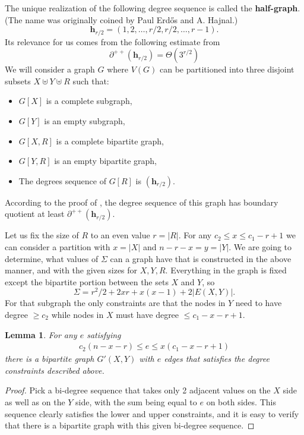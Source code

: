 \documentclass[11pt]{elsarticle}
\theoremstyle{plain}
\newtheorem{lemma}[theorem]{Lemma}
\theoremstyle{definition}
\newcommand{\pppp}[1]{\partial^{++}(#1)}
\begin{document}
The unique realization of the following degree sequence is called the \textbf{half-graph}. (The name was originally coined by Paul Erd\H{o}s and A. Hajnal.)
$$
\mathbf{h}_{r/2}=(1,2,\dots,r/2,r/2,\dots, r-1).
$$
Its relevance for us comes from the following estimate from~\cite{JMS92}
\begin{equation}\label{eq:fully-iff3}
\pppp {\mathbf{h}_{r/2}}= \Theta\left(3^{r/2}\right)%
\end{equation}
We will consider a graph $G$ where $V(G)$ can be partitioned into three disjoint subsets $X \uplus Y \uplus R$ such that:
\begin{itemize}
    \item $G[X]$ is a complete subgraph,
    \item $G[Y]$ is an empty subgraph,
    \item $G[X,R]$ is a complete bipartite graph,
    \item $G[Y,R]$ is an empty bipartite graph,
    \item The degrees sequence of $G[R]$ is $(\mathbf{h}_{r/2}).$
\end{itemize}
According to the proof of  \cite[Theorem 8.2]{JMS92},  the degree sequence of this graph has boundary quotient at least $\pppp {\mathbf{h}_{r/2}}$.

Let us fix the size of $R$ to an even value \(r=|R|\). For any \(c_2 \leq x \leq c_1-r+1\) we can consider a partition with \(x=|X|\) and \(n-r-x=y=|Y|\). We are going to determine, what values of $\Sigma$ can a graph have that is constructed in the above manner, and with the given sizes for $X,Y,R$. Everything in the graph is fixed except the bipartite portion between the sets $X$ and $Y$, so
\[\Sigma = r^2/2 + 2xr+ x(x-1)+2|E(X,Y)|.\] For that subgraph the only constraints are that the nodes in $Y$ need to have degree $\geq c_2$ while nodes in $X$ must have degree $\leq c_1-x-r+1$.

\begin{lemma}
    For any $e$ satisfying
\begin{align}
    c_2 (n-x-r) \leq e \leq x(c_1-x-r+1)\label{eq:a_cons}
\end{align}
there is a bipartite graph $G'(X,Y)$ with $e$ edges that satisfies the degree constraints described above.
\end{lemma}

\begin{proof}
    Pick a bi-degree sequence that takes only 2 adjacent values on the $X$ side as well as on the $Y$ side, with the sum being equal to $e$ on both sides. This sequence clearly satisfies the lower and upper constraints, and it is easy to verify that there is a bipartite graph with this given bi-degree sequence.
\end{proof}
\end{document}
